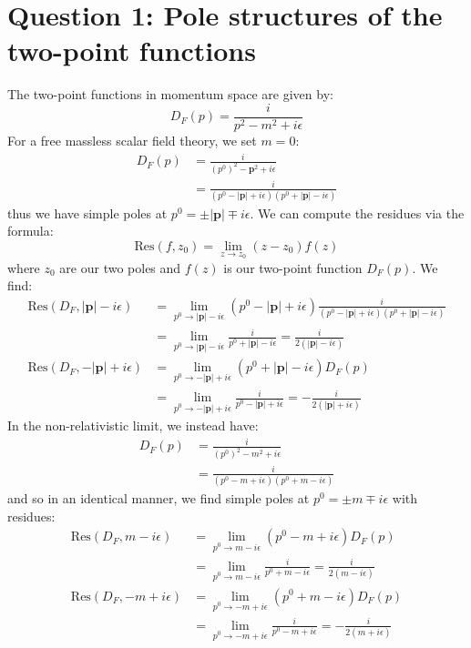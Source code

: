 \documentclass[12pt]{article}
\newcommand{\+}{\dagger}
\begin{document}
\section*{Question 1: Pole structures of the two-point functions}
The two-point functions in momentum space are given by:
\begin{equation*}
    D_F(p) = \frac{i}{p^2 - m^2 + i\epsilon}
\end{equation*}
For a free massless scalar field theory, we set $m=0$:
\begin{align*}
    D_F(p) &= \frac{i}{(p^0)^2 - \mathbf{p}^2 + i\epsilon} \\
    &= \frac{i}{(p^0 - |\mathbf{p}| + i\epsilon)(p^0 + |\mathbf{p}| - i\epsilon)}
\end{align*}
thus we have simple poles at $p^0 = \pm |\mathbf{p}| \mp i\epsilon$. We can compute the
residues via the formula:
\begin{equation*}
    \text{Res}(f, z_0) = \lim_{z \to z_0} (z - z_0) f(z)
\end{equation*}
where $z_0$ are our two poles and $f(z)$ is our two-point function $D_F(p)$. We find:
\begin{align*}
    \text{Res}(D_F, |\mathbf{p}| - i\epsilon) &= \lim_{p^0 \to |\mathbf{p}| -
    i\epsilon} (p^0 - |\mathbf{p}| + i\epsilon) \frac{i}{(p^0 - |\mathbf{p}| + i\epsilon)(p^0 + |\mathbf{p}| - i\epsilon)}
 \\
    &= \lim_{p^0 \to |\mathbf{p}| - i\epsilon} \frac{i}{p^0 + |\mathbf{p}| -
    i\epsilon} = \frac{i}{2(|\mathbf{p}|  - i\epsilon)} \\
    \text{Res}(D_F, -|\mathbf{p}| + i\epsilon) &= \lim_{p^0 \to -|\mathbf{p}| +
    i\epsilon} (p^0 + |\mathbf{p}| - i\epsilon) D_F(p) \\
    &= \lim_{p^0 \to -|\mathbf{p}| + i\epsilon} \frac{i}{p^0 - |\mathbf{p}| +
    i\epsilon} = -\frac{i}{2(|\mathbf{p}| + i\epsilon)}
\end{align*}
In the non-relativistic limit, we instead have:
\begin{align*}
    D_F(p) &= \frac{i}{(p^0)^2 - m^2 + i\epsilon} \\
    &= \frac{i}{(p^0 - m + i\epsilon)(p^0 + m - i\epsilon)}
\end{align*}
and so in an identical manner, we find simple poles at $p^0 = \pm m \mp i\epsilon$ with
residues:
\begin{align*}
    \text{Res}(D_F, m - i\epsilon) &= \lim_{p^0 \to m - i\epsilon} (p^0 - m + i\epsilon)
    D_F(p) \\
    &= \lim_{p^0 \to m - i\epsilon} \frac{i}{p^0 + m - i\epsilon} = \frac{i}{2(m - i\epsilon)} \\
    \text{Res}(D_F, -m + i\epsilon) &= \lim_{p^0 \to -m + i\epsilon} (p^0 + m - i\epsilon)
    D_F(p) \\
    &= \lim_{p^0 \to -m + i\epsilon} \frac{i}{p^0 - m + i\epsilon} = -\frac{i}{2(m + i\epsilon)} \\
\end{align*}
\end{document}
